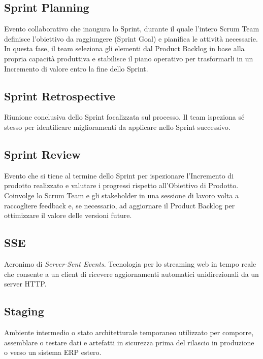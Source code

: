 \documentclass[a4paper, 11pt, oneside]{scrartcl} %
\begin{document}
\subsection*{Sprint Planning}
Evento collaborativo che inaugura lo Sprint, durante il quale l'intero Scrum Team definisce l'obiettivo da raggiungere (Sprint Goal) e pianifica le attività necessarie. In questa fase, il team seleziona gli elementi dal Product Backlog in base alla propria capacità produttiva e stabilisce il piano operativo per trasformarli in un Incremento di valore entro la fine dello Sprint.
\vspace{0.5cm}

\subsection*{Sprint Retrospective}
Riunione conclusiva dello Sprint focalizzata sul processo. Il team ispeziona sé stesso per identificare miglioramenti da applicare nello Sprint successivo.
\vspace{0.5cm}

\subsection*{Sprint Review}
Evento che si tiene al termine dello Sprint per ispezionare l'Incremento di prodotto realizzato e valutare i progressi rispetto all'Obiettivo di Prodotto. Coinvolge lo Scrum Team e gli stakeholder in una sessione di lavoro volta a raccogliere feedback e, se necessario, ad aggiornare il Product Backlog per ottimizzare il valore delle versioni future.
\vspace{0.5cm}

\subsection*{SSE}
Acronimo di \textit{Server-Sent Events}. Tecnologia per lo streaming web in tempo reale che consente a un client di ricevere aggiornamenti automatici unidirezionali da un server HTTP.
\vspace{0.5cm}

\subsection*{Staging}
Ambiente intermedio o stato architetturale temporaneo utilizzato per comporre, assemblare o testare dati e artefatti in sicurezza prima del rilascio in produzione o verso un sistema ERP estero.
\vspace{0.5cm}
\end{document}
